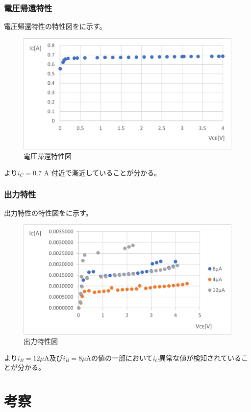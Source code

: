 \documentclass[11pt,dvipdfmx]{jarticle}
\begin{document}
		\subsubsection{電圧帰還特性}
		電圧帰還特性の特性図をに示す。
		\begin{figure}[H]
			\centering
			\includegraphics[scale=0.8]{fig/電圧帰還特性図.png}
			\caption{電圧帰還特性図}
			\label{fig:電圧帰還特性図}
		\end{figure}
		より$i_C = 0.7$ A 付近で漸近していることが分かる。
		\subsubsection{出力特性}
		出力特性の特性図をに示す。
		\begin{figure}[H]
			\centering
			\includegraphics[scale=0.8]{fig/出力特性図.png}
			\caption{出力特性図}
			\label{fig:出力特性図}
		\end{figure}
		より$i_B = 12 \mu$A及び$i_B = 8 \mu$Aの値の一部において$i_C$異常な値が検知されていることが分かる。
\section{考察}
\end{document}
